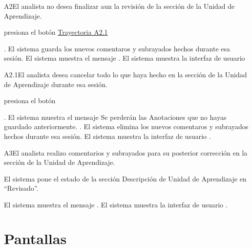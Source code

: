 	
\begin{UCtrayectoriaA}{A2}{El analista no desea finalizar aun la revisión de la sección de la Unidad de Aprendizaje.}

    \hypertarget{SP2-CU8-A2}{\UCpaso[\UCactor] presiona el botón  \hyperlink{SP2-CU8-A2.1}{Trayectoria A2.1}}. 
    \UCpaso El sistema guarda los nuevos comentaros y subrayados hechos durante esa sesión.
    \UCpaso El sistema muestra el mensaje .
    \UCpaso El sistema muestra la interfaz de usuario 
\end{UCtrayectoriaA}

\begin{UCtrayectoriaA}{A2.1}{El analista desea cancelar todo lo que haya hecho en la sección de la Unidad de Aprendizaje durante esa sesión.}

	\hypertarget{SP2-CU8-A2.1}{\UCpaso[\UCactor] presiona el botón }. 
    \UCpaso El sistema muestra el mensaje 
Se perderán las Anotaciones que no hayas guardado anteriormente. .
    \UCpaso El sistema elimina los nuevos comentaros y subrayados hechos durante esa sesión.
    \UCpaso El sistema muestra la interfaz de usuario .
\end{UCtrayectoriaA}

	
\begin{UCtrayectoriaA}{A3}{El analista realizo comentarios y subrayados para su posterior corrección en la sección de la Unidad de Aprendizaje.} 

	\hypertarget{SP2-CU8-A3}{\UCpaso El sistema pone el estado de la sección Descripción de Unidad de Aprendizaje en “Revisado”.}
    \UCpaso El sistema muestra el mensaje .
    \UCpaso El sistema muestra la interfaz de usuario .
\end{UCtrayectoriaA}

\chapter{Pantallas}

